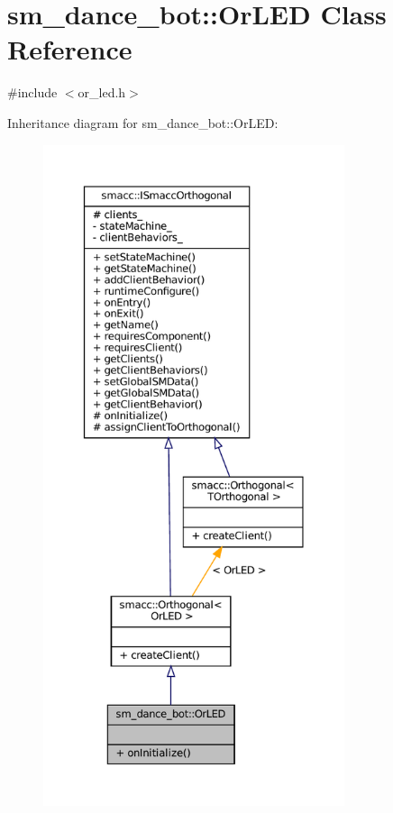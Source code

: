 \hypertarget{classsm__dance__bot_1_1OrLED}{}\section{sm\+\_\+dance\+\_\+bot\+:\+:Or\+L\+ED Class Reference}
\label{classsm__dance__bot_1_1OrLED}


{\ttfamily \#include $<$or\+\_\+led.\+h$>$}



Inheritance diagram for sm\+\_\+dance\+\_\+bot\+:\+:Or\+L\+ED\+:
\nopagebreak
\begin{figure}[H]
\begin{center}
\leavevmode
\includegraphics[height=550pt]{classsm__dance__bot_1_1OrLED__inherit__graph}
\end{center}
\end{figure}


